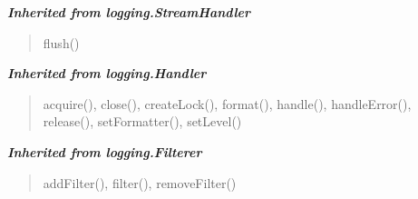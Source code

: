\large{\textbf{\textit{Inherited from logging.StreamHandler}}}

\begin{quote}
flush()
\end{quote}

\large{\textbf{\textit{Inherited from logging.Handler}}}

\begin{quote}
acquire(), close(), createLock(), format(), handle(), handleError(), release(), setFormatter(), setLevel()
\end{quote}

\large{\textbf{\textit{Inherited from logging.Filterer}}}

\begin{quote}
addFilter(), filter(), removeFilter()
\end{quote}
